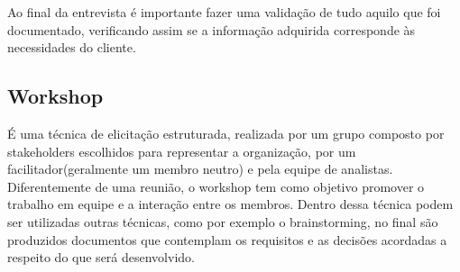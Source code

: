 Ao final da entrevista é importante fazer uma validação de tudo aquilo que foi documentado, verificando assim se a informação adquirida corresponde às necessidades do cliente.
\subsection{Workshop}
É uma técnica de elicitação estruturada, realizada por um grupo composto por stakeholders escolhidos para representar a organização, por um facilitador(geralmente um membro neutro) e pela equipe de analistas. Diferentemente de uma reunião, o workshop tem como objetivo promover o trabalho em equipe e a interação entre os membros. Dentro dessa técnica podem ser utilizadas outras técnicas, como por exemplo o brainstorming, no final são produzidos documentos que contemplam os requisitos e as decisões acordadas a respeito do que será desenvolvido.